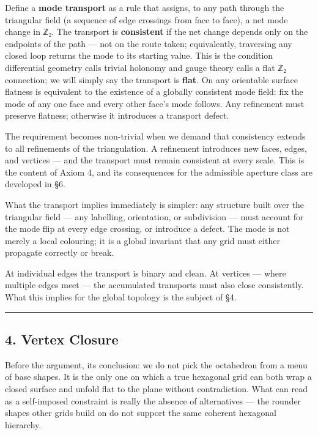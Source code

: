 \documentclass[
  11pt,
  a4paper,
]{article}
\begin{document}
Define a \textbf{mode transport} as a rule that assigns, to any path
through the triangular field (a sequence of edge crossings from face to
face), a net mode change in ℤ₂. The transport is \textbf{consistent} if
the net change depends only on the endpoints of the path --- not on the
route taken; equivalently, traversing any closed loop returns the mode
to its starting value. This is the condition differential geometry calls
trivial holonomy and gauge theory calls a flat ℤ₂ connection; we will
simply say the transport is \textbf{flat}. On any orientable surface
flatness is equivalent to the existence of a globally consistent mode
field: fix the mode of any one face and every other face's mode follows.
Any refinement must preserve flatness; otherwise it introduces a
transport defect.

The requirement becomes non-trivial when we demand that consistency
extends to all refinements of the triangulation. A refinement introduces
new faces, edges, and vertices --- and the transport must remain
consistent at every scale. This is the content of Axiom 4, and its
consequences for the admissible aperture class are developed in §6.

What the transport implies immediately is simpler: any structure built
over the triangular field --- any labelling, orientation, or subdivision
--- must account for the mode flip at every edge crossing, or introduce
a defect. The mode is not merely a local colouring; it is a global
invariant that any grid must either propagate correctly or break.

At individual edges the transport is binary and clean. At vertices ---
where multiple edges meet --- the accumulated transports must also close
consistently. What this implies for the global topology is the subject
of §4.

\begin{center}\rule{0.5\linewidth}{0.5pt}\end{center}

\subsection{4. Vertex Closure}\label{vertex-closure}

Before the argument, its conclusion: we do not pick the octahedron from
a menu of base shapes. It is the only one on which a true hexagonal grid
can both wrap a closed surface and unfold flat to the plane without
contradiction. What can read as a self-imposed constraint is really the
absence of alternatives --- the rounder shapes other grids build on do
not support the same coherent hexagonal hierarchy.
\end{document}

